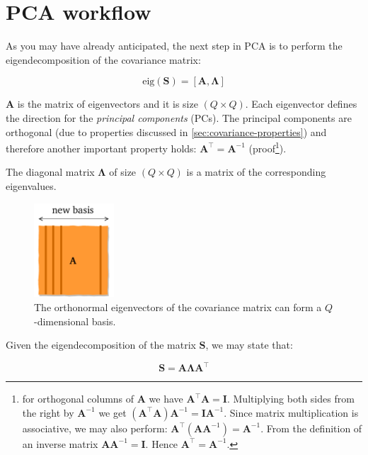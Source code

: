 \documentclass[10pt,twocolumn]{article}
\begin{document}
\section{PCA workflow}

As you may have already anticipated, the next step in PCA is to perform the eigendecomposition of the covariance matrix:

\begin{equation} \label{eq:eig-dec}
\text{eig}(\mathbf{S}) = [\mathbf{A}, \mathbf{\Lambda}]
\end{equation}

$\mathbf{A}$ is the matrix of eigenvectors and it is size $(Q \times Q)$. Each eigenvector defines the direction for the \textit{principal components} (PCs). The principal components are orthogonal (due to properties discussed in \ref{sec:covariance-properties}) and therefore another important property holds: $\mathbf{A}^{\top} = \mathbf{A}^{-1}$ (proof\footnote{for orthogonal columns of $\mathbf{A}$ we have $\mathbf{A}^{\top} \mathbf{A} = \mathbf{I}$. Multiplying both sides from the right by $ \mathbf{A}^{-1}$ we get $(\mathbf{A}^{\top} \mathbf{A}) \mathbf{A}^{-1}= \mathbf{I}\mathbf{A}^{-1}$. Since matrix multiplication is associative, we may also perform: $\mathbf{A}^{\top} (\mathbf{A} \mathbf{A}^{-1}) = \mathbf{A}^{-1}$. From the definition of an inverse matrix $\mathbf{A} \mathbf{A}^{-1} = \mathbf{I}$. Hence $\mathbf{A}^{\top} = \mathbf{A}^{-1}$.}).

The diagonal matrix $\mathbf{\Lambda}$ of size $(Q \times Q)$ is a matrix of the corresponding eigenvalues.

\begin{figure}[H]
\centering\includegraphics[width=3cm]{new-basis.pdf}
\caption{The orthonormal eigenvectors of the covariance matrix can form a $Q$-dimensional basis.}
\label{fig:new-basis}
\end{figure}

Given the eigendecomposition of the matrix $\mathbf{S}$, we may state that: 

\begin{equation} \label{eq:eig-dec-cov-matrix}
\mathbf{S} = \mathbf{A} \mathbf{\Lambda} \mathbf{A}^{\top}
\end{equation}
\end{document}
